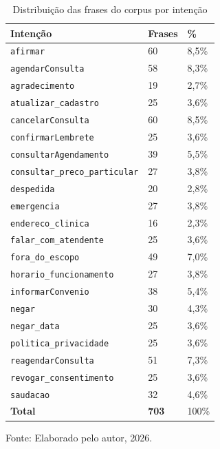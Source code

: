 \begin{table}[H]
\centering
\caption{Distribuição das frases do corpus por intenção}
\label{tab:distribuicao-corpus}
\small
\begin{tabular}{p{6.2cm}p{2.5cm}p{2.5cm}}
\hline
\textbf{Intenção} & \textbf{Frases} & \textbf{\%} \\
\hline
\texttt{afirmar} & 60 & 8,5\% \\
\texttt{agendarConsulta} & 58 & 8,3\% \\
\texttt{agradecimento} & 19 & 2,7\% \\
\texttt{atualizar\_\allowbreak{}cadastro} & 25 & 3,6\% \\
\texttt{cancelarConsulta} & 60 & 8,5\% \\
\texttt{confirmarLembrete} & 25 & 3,6\% \\
\texttt{consultarAgendamento} & 39 & 5,5\% \\
\texttt{consultar\_\allowbreak{}preco\_\allowbreak{}particular} & 27 & 3,8\% \\
\texttt{despedida} & 20 & 2,8\% \\
\texttt{emergencia} & 27 & 3,8\% \\
\texttt{endereco\_\allowbreak{}clinica} & 16 & 2,3\% \\
\texttt{falar\_\allowbreak{}com\_\allowbreak{}atendente} & 25 & 3,6\% \\
\texttt{fora\_\allowbreak{}do\_\allowbreak{}escopo} & 49 & 7,0\% \\
\texttt{horario\_\allowbreak{}funcionamento} & 27 & 3,8\% \\
\texttt{informarConvenio} & 38 & 5,4\% \\
\texttt{negar} & 30 & 4,3\% \\
\texttt{negar\_\allowbreak{}data} & 25 & 3,6\% \\
\texttt{politica\_\allowbreak{}privacidade} & 25 & 3,6\% \\
\texttt{reagendarConsulta} & 51 & 7,3\% \\
\texttt{revogar\_\allowbreak{}consentimento} & 25 & 3,6\% \\
\texttt{saudacao} & 32 & 4,6\% \\
\hline
\textbf{Total} & \textbf{703} & 100\% \\
\hline
\end{tabular}
\vspace{0.3cm}

\footnotesize{Fonte: Elaborado pelo autor, 2026.}
\end{table}
